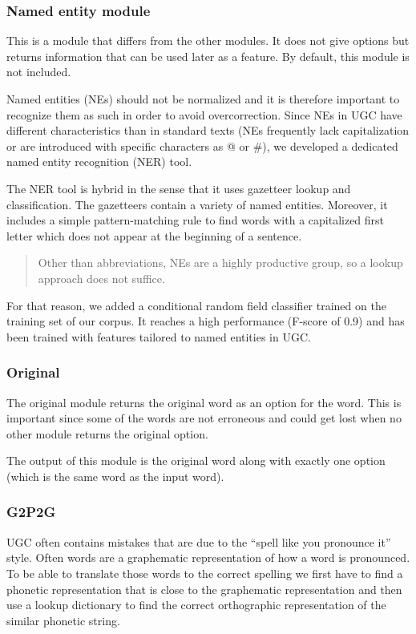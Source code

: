\documentclass[letterpaper,10pt,english]{sphinxmanual}
\begin{document}
\subsubsection{Named entity module}
\label{README:named-entity-module}
This is a module that differs from the other modules. It does not give options but returns information that can be used later as a feature. By default, this module is not included.

Named entities (NEs) should not be normalized and it is therefore important to recognize them as such in order to avoid overcorrection. Since NEs in UGC have different characteristics than in standard texts (NEs frequently lack capitalization or are introduced with specific characters as @ or \#), we developed a dedicated named entity recognition (NER) tool.

The NER tool is hybrid in the sense that it uses gazetteer lookup and classification. The gazetteers  contain a variety of named entities. Moreover, it includes a simple pattern-matching rule to find words with a capitalized first letter which does not appear at the beginning of a sentence.
\begin{quote}

Other than abbreviations, NEs are a highly productive group, so a lookup approach does not suffice.
\end{quote}

For that reason, we added a conditional random field classifier trained on the training set of our corpus. It reaches a high performance (F-score of 0.9) and has been trained with features tailored to named entities in UGC.


\subsubsection{Original}
\label{README:original}
The original module returns the original word as an option for the word. This is important since some of the words are not
erroneous and could get lost when no other module returns the original option.

The output of this module is the original word along with exactly one option (which is the same word as the input word).


\subsubsection{G2P2G}
\label{README:g2p2g}
UGC often contains mistakes that are due to the ``spell like you pronounce it'' style. Often words are a graphematic representation of
how a word is pronounced. To be able to translate those words to the correct spelling we first have to find a phonetic representation
that is close to the graphematic representation and then use a lookup dictionary to find the correct orthographic representation of the
similar phonetic string.
\end{document}
